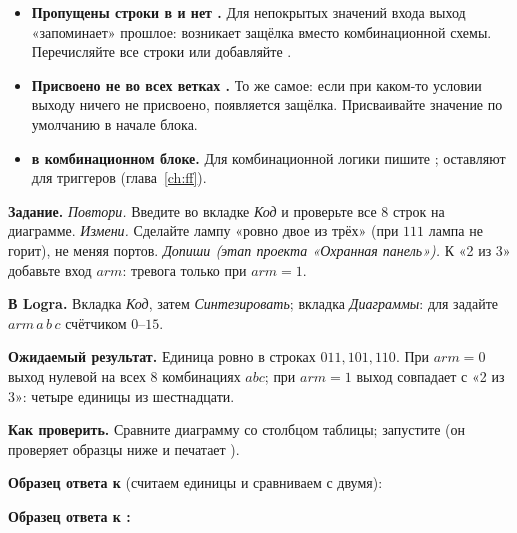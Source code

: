 \begin{warnbox}
\begin{itemize}
  \item \textbf{Пропущены строки в  и нет .} Для
        непокрытых значений входа выход «запоминает» прошлое: возникает
        защёлка вместо комбинационной схемы. Перечисляйте все строки или
        добавляйте .
  \item \textbf{Присвоено не во всех ветках .} То же самое: если
        при каком-то условии выходу ничего не присвоено, появляется защёлка.
        Присваивайте значение по умолчанию в начале блока.
  \item \textbf{\code{<=} в комбинационном блоке.} Для комбинационной логики
        пишите \code{=}; \code{<=} оставляют для триггеров
        (глава~\ref{ch:ff}).
\end{itemize}
\end{warnbox}

\begin{diybox}
\textbf{Задание.}  \emph{Повтори.} Введите  во
вкладке \emph{Код} и проверьте все 8 строк на диаграмме. 
\emph{Измени.} Сделайте лампу «ровно двое из трёх» (при $111$ лампа не
горит), не меняя портов.  \emph{Допиши (этап проекта «Охранная
панель»).} К «2 из 3» добавьте вход $arm$: тревога только при $arm=1$.

\textbf{В Logra.} Вкладка \emph{Код}, затем \emph{Синтезировать};
вкладка \emph{Диаграммы}: для  задайте $arm\,a\,b\,c$ счётчиком
$0$--$15$.

\textbf{Ожидаемый результат.}  Единица ровно в строках $011,101,110$.
 При $arm=0$ выход нулевой на всех 8 комбинациях $abc$; при
$arm=1$ выход совпадает с «2 из 3»: четыре единицы из шестнадцати.

\textbf{Как проверить.} Сравните диаграмму со столбцом таблицы; запустите
 (он проверяет образцы ниже и печатает ).
\end{diybox}

\textbf{Образец ответа к } (считаем единицы и сравниваем с двумя):


\textbf{Образец ответа к :}


